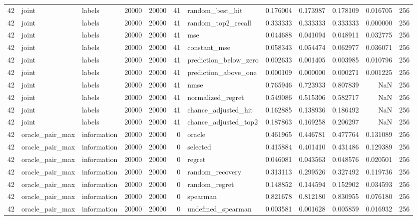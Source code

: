 \begin{tabular}{rllrrrlrrrrr}
42 & joint & labels & 20000 & 20000 & 41 & random_best_hit & 0.176004 & 0.173987 & 0.178109 & 0.016705 & 256 \\
42 & joint & labels & 20000 & 20000 & 41 & random_top2_recall & 0.333333 & 0.333333 & 0.333333 & 0.000000 & 256 \\
42 & joint & labels & 20000 & 20000 & 41 & mse & 0.044688 & 0.041094 & 0.048911 & 0.032775 & 256 \\
42 & joint & labels & 20000 & 20000 & 41 & constant_mse & 0.058343 & 0.054474 & 0.062977 & 0.036071 & 256 \\
42 & joint & labels & 20000 & 20000 & 41 & prediction_below_zero & 0.002633 & 0.001405 & 0.003985 & 0.010796 & 256 \\
42 & joint & labels & 20000 & 20000 & 41 & prediction_above_one & 0.000109 & 0.000000 & 0.000271 & 0.001225 & 256 \\
42 & joint & labels & 20000 & 20000 & 41 & nmse & 0.765946 & 0.723933 & 0.807839 & NaN & 256 \\
42 & joint & labels & 20000 & 20000 & 41 & normalized_regret & 0.549086 & 0.515306 & 0.582717 & NaN & 256 \\
42 & joint & labels & 20000 & 20000 & 41 & chance_adjusted_hit & 0.162885 & 0.138936 & 0.186492 & NaN & 256 \\
42 & joint & labels & 20000 & 20000 & 41 & chance_adjusted_top2 & 0.187863 & 0.169258 & 0.206297 & NaN & 256 \\
42 & oracle_pair_max & information & 20000 & 20000 & 0 & oracle & 0.461965 & 0.446781 & 0.477764 & 0.131089 & 256 \\
42 & oracle_pair_max & information & 20000 & 20000 & 0 & selected & 0.415884 & 0.401410 & 0.431486 & 0.129389 & 256 \\
42 & oracle_pair_max & information & 20000 & 20000 & 0 & regret & 0.046081 & 0.043563 & 0.048576 & 0.020501 & 256 \\
42 & oracle_pair_max & information & 20000 & 20000 & 0 & random_recovery & 0.313113 & 0.299526 & 0.327492 & 0.119736 & 256 \\
42 & oracle_pair_max & information & 20000 & 20000 & 0 & random_regret & 0.148852 & 0.144594 & 0.152902 & 0.034593 & 256 \\
42 & oracle_pair_max & information & 20000 & 20000 & 0 & spearman & 0.821678 & 0.812180 & 0.830955 & 0.076180 & 256 \\
42 & oracle_pair_max & information & 20000 & 20000 & 0 & undefined_spearman & 0.003581 & 0.001628 & 0.005859 & 0.016932 & 256 \\

\end{tabular}
